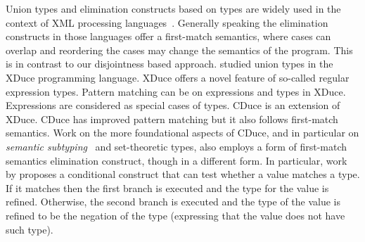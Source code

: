 
\begin{comment}
\citet{freeman1991refinement} studied union types along with intersection types
in setting of refinement types for ML. Main focus of their work is to infer
more precise types of expressions, which they call
refinement types. Their work is targeted to contribute for the types
in ML and not for the expressions. Therefore, they did not define
expressions and dynamic semantics. On the contrary, our work provides
a complete calculus with type sound dynamic semantics.
\bruno{and ... Do they have an elimination construct for unions?
  If so how is that related to our work?}.
\baber{I added few more lines in Freeman citation.}
\end{comment}
Union types and elimination constructs based on types are
widely used in the context of XML processing languages~\cite{hosoya2003xduce,benzaken2003cduce}.
Generally speaking the elimination constructs in those
languages offer a first-match semantics,
where cases can overlap and reordering the cases may change the semantics of the program.
This is in contrast to our disjointness based approach.
\citet{hosoya2003xduce} studied union types
in the XDuce programming language. XDuce offers a novel feature of
so-called regular expression types. Pattern matching can be on
expressions and types in XDuce.  Expressions are considered as special
cases of types.  CDuce
\cite{benzaken2003cduce} is an extension of XDuce. CDuce has improved
pattern matching but it also
follows first-match semantics. Work on the more foundational aspects
of CDuce, and in particular on \emph{semantic subtyping}~\cite{frisch2002semantic}
and set-theoretic types,
also employs a form of first-match semantics elimination construct, though in a different form.
In particular, work by \citet{castagna2005gentle,castagna2017gradual}
proposes a conditional construct that can test whether a value matches a type.
If it matches then the first branch is executed and the type for the value is refined.
Otherwise, the second branch is executed and the type of the value is refined to be
the negation of the type (expressing that the value does not have such type).

